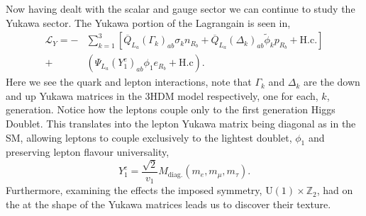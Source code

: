 \documentclass[10pt]{book}
\renewcommand{\(}{\left(}
\renewcommand{\)}{\right)}
\renewcommand{\[}{\left[}
\renewcommand{\]}{\right]}
\begin{document}
Now having dealt with the scalar and gauge sector we can continue to study the Yukawa sector. 
%
The Yukawa portion of the Lagrangain is seen in,
\begin{equation} \label{eq:3HDM_Yuk} \begin{split} 
\mathcal{L}_Y = - & \sum_{k=1}^3 \left[ \overline{Q}_{L_a} \left( \Gamma_k \right)_{ab} \sigma_k n_{R_b} + \overline{Q}_{L_a} \left( \Delta_k \right)_{ab} \tilde{\phi}_k p_{R_b} + \text{H.c}.  \right] \\ + & \left( \Psi_{L_a} \left( Y^e_1 \right)_{ab} \phi_1 e_{R_b} + \text{H.c} \right) .
\end{split} \end{equation} 
Here we see the quark and lepton interactions, note that $\Gamma_k$ and $\Delta_k$ are the down and up Yukawa matrices in the 3HDM model respectively, one for each, $k$, generation.
%
Notice how the leptons couple only to the first generation Higgs Doublet. 
%
This translates into the lepton Yukawa matrix being diagonal as in the SM, allowing leptons to couple exclusively to the lightest doublet, $\phi_1$ and preserving lepton flavour universality, 
%
\begin{equation}
Y^e_1 = \frac{\sqrt{2}}{v_1} M_{\text{diag.}}\left( m_e , m_\mu , m_\tau \right) .
\end{equation} 
%
%
Furthermore, examining the effects the imposed symmetry, $\mathrm{U}(1)\times\mathbb{Z}_2$, had on the at the shape of the Yukawa matrices leads us to discover their texture.  
%
\end{document}
